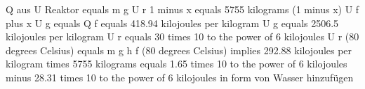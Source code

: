 Q aus 
U Reaktor equals m g U r 1 minus x equals 5755 kilograms (1 minus x) U f plus x U g equals 
Q f equals 418.94 kilojoules per kilogram U g equals 2506.5 kilojoules per kilogram
U r equals 30 times 10 to the power of 6 kilojoules
U r (80 degrees Celsius) equals m g h f (80 degrees Celsius) implies 292.88 kilojoules per kilogram times 5755 kilograms equals 1.65 times 10 to the power of 6 kilojoules
minus 28.31 times 10 to the power of 6 kilojoules in form von Wasser hinzufügen